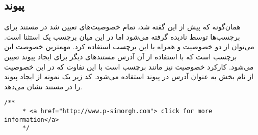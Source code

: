 \subsection{پیوند}
همان‌گونه که پیش از این گفته شد، تمام خصوصیت‌های تعیین شد در مستند برای برچسب‌ها
توسط  نادیده گرفته می‌شود اما در این میان برچسب  یک استثنا است. می‌توان از دو
خصوصیت  و   همراه با این برچسب استفاده کرد. مهمترین خصوصت این 
برچسب  است که با استفاده از آن آدرس مستندهای دیگر برای ایجاد پیوند تعیین می‌شود.
کارکرد خصوصیت  نیز مانند برچسب  است با این تفاوت که در این 
خصوصیت از نام بخش به عنوان آدرس در  پیوند استفاده می‌شود. کد زیر یک نمونه از ایجاد پیوند را در
مستند نشان می‌دهد.
\begin{latin}
\lstset{language=C++}  
\begin{lstlisting}[frame=single] 
    /**
     * <a href="http://www.p-simorgh.com"> click for more information</a>
     */
\end{lstlisting}
\end{latin}


